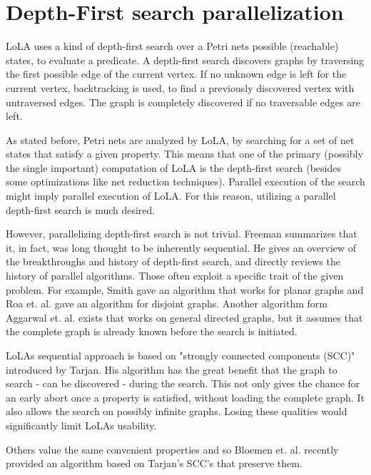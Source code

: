 \section{Depth-First search parallelization}
LoLA uses a kind of depth-first search over a Petri nets possible (reachable) states, to evaluate a predicate. A depth-first search discovers graphs\cite[chapter~1]{bondy1976graph} by traversing the first possible edge of the current vertex. If no unknown edge is left for the current vertex, backtracking\cite{golomb1965backtrack} is used, to find a previously discovered vertex with untraversed edges. The graph is completely discovered if no traversable edges are left.

As stated before, Petri nets are analyzed by LoLA, by searching for a set of net states that satisfy a given property. This means that one of the primary (possibly the single important) computation of LoLA is the depth-first search (besides some optimizations like net reduction techniques). Parallel execution of the search might imply parallel execution of LoLA. For this reason, utilizing a parallel depth-first search is much desired.

However, parallelizing depth-first search is not trivial. Freeman summarizes that it, in fact, was long thought to be inherently sequential\cite{freeman1991parallel}. He gives an overview of the breakthroughs and history of depth-first search, and  directly reviews the history of parallel algorithms. Those often exploit a specific trait of the given problem. For example, Smith gave an algorithm that works for planar graphs\cite{smith1986parallel} and Roa et. al. gave an algorithm for disjoint graphs\cite{rao1987parallel}. Another algorithm form Aggarwal et. al. exists that works on general directed graphs\cite{Aggarwal:1989:PDS:73007.73035}, but it assumes that the complete graph is already known before the search is initiated.

LoLAs sequential approach is based on "strongly connected components (SCC)" introduced by Tarjan\cite{tarjan1972depth}. His algorithm has the great benefit that the graph to search - can be discovered - during the search. This not only gives the chance for an early abort once a property is satisfied, without loading the complete graph. It also allows the search on possibly infinite graphs. Losing these qualities would significantly limit LoLAs usability.

Others value the same convenient properties and so Bloemen et. al. recently provided an algorithm based on Tarjan's SCC's that preserve them\cite{bloemen2016multi}.

